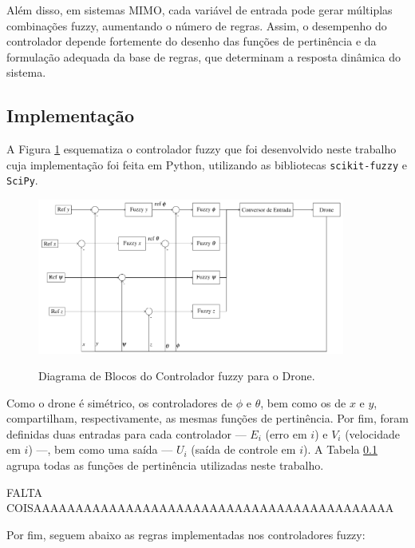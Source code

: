 Além disso, em sistemas MIMO, cada variável de entrada pode gerar 
múltiplas combinações fuzzy, aumentando o número de regras. Assim, o desempenho do controlador 
depende fortemente do desenho das funções de pertinência e da formulação adequada da base de 
regras, que determinam a resposta dinâmica do sistema.

\subsection{Implementação}
A Figura \ref{fig:pid_diagram} esquematiza o controlador fuzzy que foi desenvolvido neste trabalho cuja 
implementação foi feita em Python, utilizando as bibliotecas \texttt{scikit-fuzzy} e \texttt{SciPy}. 
\begin{figure}[h!]
    \centering
    \caption{Diagrama de Blocos do Controlador fuzzy para o Drone.}
    \includegraphics[width=0.9\textwidth]{figs/fuzzy_drone.png}
    \label{fig:pid_diagram}
\end{figure}

\pagebreak

Como o drone é simétrico, os controladores de $\phi$ e $\theta$, bem como os de $x$ e $y$, 
compartilham, respectivamente, as mesmas funções de pertinência. Por fim, foram definidas duas 
entradas para cada controlador — $E_i$ (erro em $i$) e $V_i$ (velocidade em $i$) —, bem como uma 
saída — $U_i$ (saída de controle em $i$). A Tabela \ref{} agrupa todas as funções de pertinência 
utilizadas neste trabalho.



\pagebreak

FALTA COISAAAAAAAAAAAAAAAAAAAAAAAAAAAAAAAAAAAAAAAAAAA

Por fim, seguem abaixo as regras implementadas nos controladores fuzzy:

